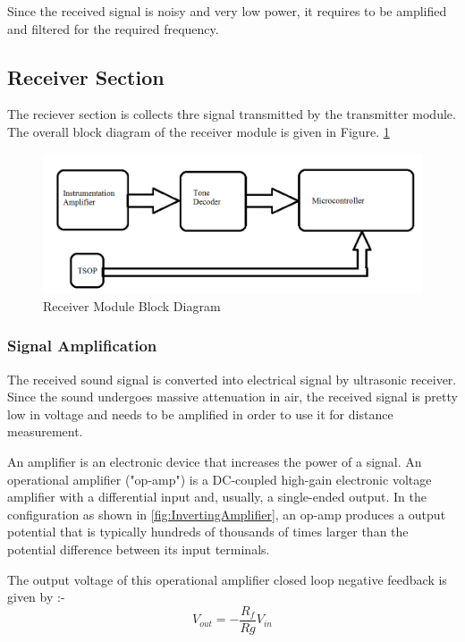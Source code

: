 Since the received signal is noisy and very low power, it requires to be amplified and 
filtered for the required frequency.
\subsection{Receiver Section}
The reciever section is collects thre signal transmitted by the transmitter module. The overall block diagram of the receiver module is given in Figure. \ref{fig:ReceiverOne}
\begin{figure}[h!]
	\centering
	\includegraphics[width=120mm]{Images/ReceiverOne.png}
	\caption{Receiver Module Block Diagram}
	\label{fig:ReceiverOne}
\end{figure}

\subsubsection{Signal Amplification}

The received sound signal is converted into electrical signal by ultrasonic receiver. Since the sound undergoes massive attenuation in air, the received signal is pretty low in voltage and needs to be amplified in order to use it for distance measurement. 

An amplifier is an electronic device that increases the power of a signal. An operational amplifier ("op-amp") is a DC-coupled high-gain electronic voltage amplifier with a differential input and, usually, a single-ended output. In the configuration as shown in \ref{fig:InvertingAmplifier}, an op-amp produces a output potential that is typically hundreds of thousands of times larger than the potential difference between its input terminals. 



The output voltage of this operational amplifier closed loop negative feedback is given by :-
\begin{equation}
	V_{out} = -\frac{R_f}{Rg}V_{in}
\end{equation} 


